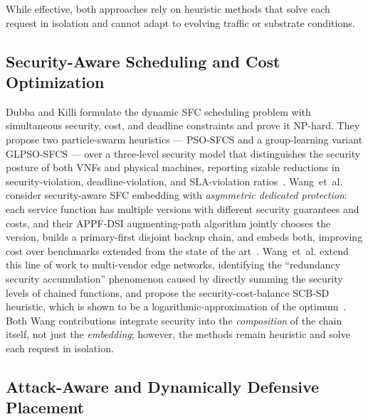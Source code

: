 While effective, both approaches rely on heuristic methods that solve
each request in isolation and cannot adapt to evolving traffic or
substrate conditions.

\subsection{Security-Aware Scheduling and Cost Optimization}

Dubba and Killi formulate the dynamic SFC scheduling problem with
simultaneous security, cost, and deadline constraints and prove it
NP-hard. They propose two particle-swarm heuristics --- PSO-SFCS and a
group-learning variant GLPSO-SFCS --- over a three-level security
model that distinguishes the security posture of both VNFs and
physical machines, reporting sizable reductions in security-violation,
deadline-violation, and SLA-violation
ratios~\cite{dubba_security-aware_2024}. Wang~et~al. consider
security-aware SFC embedding with \textit{asymmetric dedicated
protection}: each service function has multiple versions with
different security guarantees and costs, and their APPF-DSI augmenting-path
algorithm jointly chooses the version, builds a primary-first
disjoint backup chain, and embeds both, improving cost over benchmarks
extended from the state of the
art~\cite{wang_security-aware_2024}. Wang~et~al. extend this line of
work to multi-vendor edge networks, identifying the ``redundancy
security accumulation'' phenomenon caused by directly summing the
security levels of chained functions, and propose the
security-cost-balance SCB-SD heuristic, which is shown to be a
logarithmic-approximation of the
optimum~\cite{wang_towards_2025}. Both Wang contributions integrate
security into the \emph{composition} of the chain itself, not just the
\emph{embedding}; however, the methods remain heuristic and solve each
request in isolation.

\subsection{Attack-Aware and Dynamically Defensive Placement}


